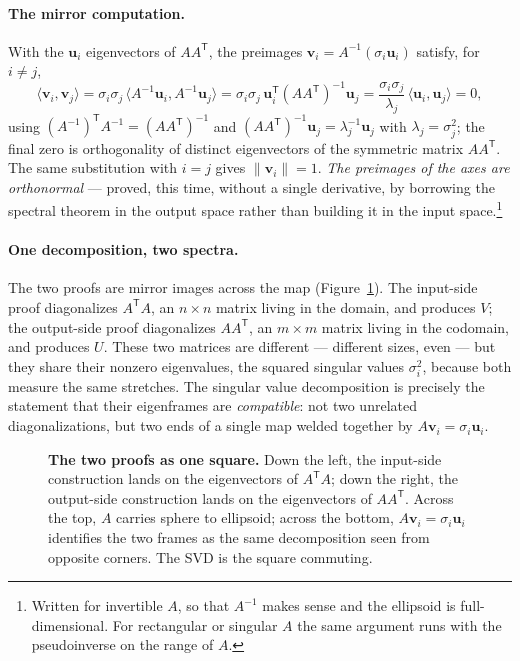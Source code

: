 \documentclass[11pt]{article}
\numberwithin{equation}{section}
\newcommand{\T}{^{\mathsf{T}}}
\newcommand{\ip}[2]{\langle #1, #2 \rangle}
\newcommand{\vv}[1]{\mathbf{v}_{#1}}
\newcommand{\uu}[1]{\mathbf{u}_{#1}}
\theoremstyle{plainish}
\begin{document}
\paragraph{The mirror computation.} With the $\uu i$ eigenvectors of $AA\T$, the
preimages $\vv i = A^{-1}(\sigma_i \uu i)$ satisfy, for $i \neq j$,
\begin{equation}\ip{\vv i}{\vv j}
  = \sigma_i \sigma_j \, \ip{A^{-1}\uu i}{A^{-1}\uu j}
  = \sigma_i \sigma_j \, \uu i\T (AA\T)^{-1} \uu j
  = \frac{\sigma_i \sigma_j}{\lambda_j}\, \ip{\uu i}{\uu j}
  = 0,
\end{equation}
using $(A^{-1})\T A^{-1} = (AA\T)^{-1}$ and $(AA\T)^{-1}\uu j = \lambda_j^{-1}\uu j$
with $\lambda_j = \sigma_j^2$; the final zero is orthogonality of distinct
eigenvectors of the symmetric matrix $AA\T$. The same substitution with $i = j$
gives $\|\vv i\| = 1$. \emph{The preimages of the axes are orthonormal} ---
proved, this time, without a single derivative, by borrowing the spectral
theorem in the output space rather than building it in the input space.\footnote{%
Written for invertible $A$, so that $A^{-1}$ makes sense and the ellipsoid is
full-dimensional. For rectangular or singular $A$ the same argument runs with
the pseudoinverse on the range of $A$.}

\paragraph{One decomposition, two spectra.} The two proofs are mirror images
across the map (Figure~\ref{fig:dual-square}). The input-side proof diagonalizes
$A\T A$, an $n \times n$ matrix living in the domain, and produces $V$; the
output-side proof diagonalizes $AA\T$, an $m \times m$ matrix living in the
codomain, and produces $U$. These two matrices are different --- different
sizes, even --- but they share their nonzero eigenvalues, the squared singular
values $\sigma_i^2$, because both measure the same stretches. The singular value
decomposition is precisely the statement that their eigenframes are
\emph{compatible}: not two unrelated diagonalizations, but two ends of a single
map welded together by $A\vv i = \sigma_i \uu i$.

\begin{figure}[htbp]
\centering

\caption{\textbf{The two proofs as one square.} Down the left, the input-side
construction lands on the eigenvectors of $A\T A$; down the right, the
output-side construction lands on the eigenvectors of $AA\T$. Across the top,
$A$ carries sphere to ellipsoid; across the bottom, $A\vv i = \sigma_i \uu i$
identifies the two frames as the same decomposition seen from opposite corners.
The SVD is the square commuting.}
\label{fig:dual-square}
\end{figure}
\end{document}
